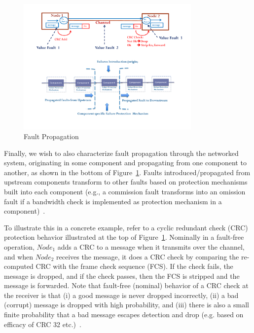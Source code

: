 \begin{figure}
\begin{center}
\includegraphics[width=0.8\textwidth]{figures/fault_propagation.pdf}
\caption{Fault Propagation}
\label{fig:fault_propagation}
\end{center}
\end{figure}

Finally, we wish to also characterize fault
propagation through the networked system, originating in some component and
propagating from one component to another, as shown in the bottom of
Figure~\ref{fig:fault_propagation}. Faults introduced/propagated from upstream
components transform to other faults based on protection mechanisms built
into
each component (e.g., a commission fault transforms into an omission fault
if a
bandwidth check is implemented as protection mechanism in a component)~\cite{theory}.

To illustrate this in a concrete example, refer to a cyclic redundant check
(CRC) protection behavior illustrated at the top of
Figure~\ref{fig:fault_propagation}. Nominally in a fault-free operation,
$Node_1$ adds a CRC to a message when it transmits over the channel, and
when
$Node_2$ receives the message, it does a CRC check by comparing the re-computed
CRC
with the frame check sequence (FCS). If the check fails, the message is dropped,
and if the check
passes, then the FCS is stripped and the message is forwarded. Note that
fault-free
(nominal) behavior of a CRC check at the receiver is that (i) a good message
is
never dropped incorrectly, (ii) a bad (corrupt) message is dropped with high
probability, and (iii) there is also a small finite probability that a bad
message escapes detection and drop (e.g. based on efficacy of CRC 32 etc.)~\cite{crc}.

